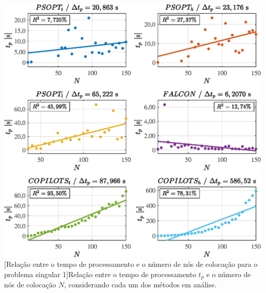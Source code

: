 \noindent
\begin{minipage}{\textwidth}
	\vspace{\onelineskip}
	\centering
	\includegraphics[scale=0.7]{fig/resultados/singular1/sens/t}
	[Relação entre o tempo de processamento e o número de nós de colocação para o problema singular 1]{Relação entre o tempo de processamento $ t_p $ e o número de nós de colocação $ N $, considerando cada um dos métodos em análise.}
	\label{fig:singular1:sensibilidade:t}
	\vspace{\onelineskip}
\end{minipage}

